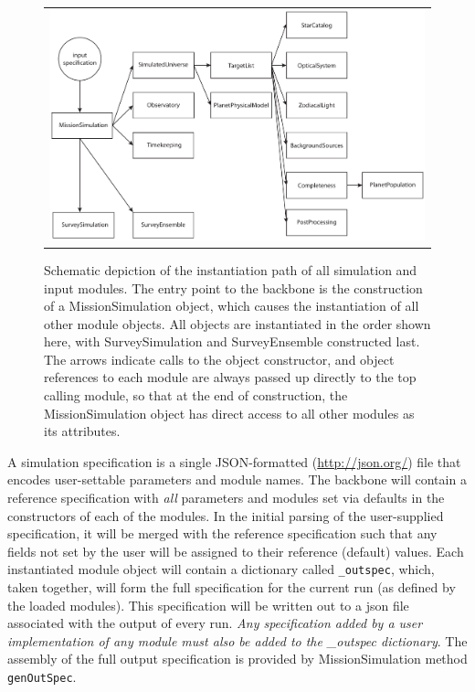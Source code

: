 \documentclass[cleanfoot]{asme2ej}
\begin{document}
\begin{figure}[ht]
    \begin{center}
        \begin{tabular}{c}
             \includegraphics[width=1\textwidth]{instantiation_tree}
        \end{tabular}
    \end{center}
    \caption{Schematic depiction of the instantiation path of all simulation and input modules.  The entry point to the backbone is the construction of a MissionSimulation object, which causes the instantiation of all other module objects.  All objects are instantiated in the order shown here, with SurveySimulation and SurveyEnsemble constructed last.  The arrows indicate calls to the object constructor, and object references to each module are always passed up directly to the top calling module, so that at the end of construction, the MissionSimulation object has direct access to all other modules as its attributes.}
    \label{fig:instantiation_tree}
\end{figure}

A simulation specification is a single JSON-formatted (\url{http://json.org/}) file that encodes user-settable parameters and module names.  The backbone will contain a reference specification with \emph{all} parameters and modules set via defaults in the constructors of each of the modules.  In the initial parsing of the user-supplied specification, it will be merged with the reference specification such that any fields not set by the user will be assigned to their reference (default) values.   Each instantiated module object will contain a dictionary called \verb+_outspec+, which, taken together, will form the full specification for the current run (as defined by the loaded modules).  This specification will be written out to a json file associated with the output of every run.  \emph{Any specification added by a user implementation of any module must also be added to the \_outspec dictionary}.  The assembly of the full output specification is provided by MissionSimulation method \verb+genOutSpec+.
\end{document}
